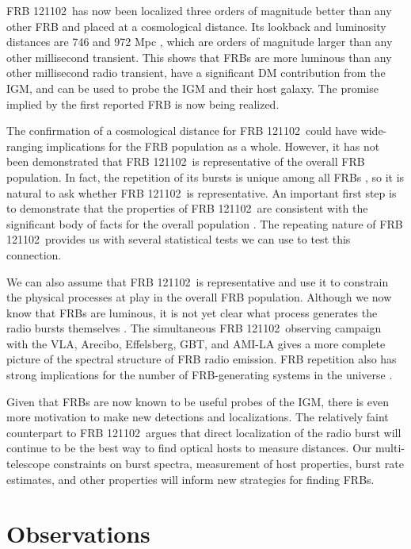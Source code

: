 \documentclass[twocolumn]{aastex61}
\newcommand{\frb}{FRB 121102}
\begin{document}
\frb\ has now been localized three orders of magnitude better than any other FRB and placed at a cosmological distance. Its lookback and luminosity distances are 746 and 972 Mpc \citep{planck15}, which are orders of magnitude larger than any other millisecond transient. This shows that FRBs are more luminous than any other millisecond radio transient, have a significant DM contribution from the IGM, and can be used to probe the IGM and their host galaxy. The promise implied by the first reported FRB \citep{2007Sci...318..777L} is now being realized.

The confirmation of a cosmological distance for \frb\ could have wide-ranging implications for the FRB population as a whole. However, it has not been demonstrated that \frb\ is representative of the overall FRB population. In fact, the repetition of its bursts is unique among all FRBs \citep{2015MNRAS.454..457P}, so it is natural to ask whether \frb\ is representative. An important first step is to demonstrate that the properties of \frb\ are consistent with the significant body of facts for the overall population \citep{2015MNRAS.451.3278M, 2016MPLA...3130013K}. The repeating nature of \frb\ provides us with several statistical tests we can use to test this connection.

We can also assume that \frb\ is representative and use it to constrain the physical processes at play in the overall FRB population. Although we now know that FRBs are luminous, it is not yet clear what process generates the radio bursts themselves \citep{2014PhRvD..89j3009K, 2014ApJ...785L..26L, 2016MNRAS.457..232C}. The simultaneous \frb\ observing campaign with the VLA, Arecibo, Effelsberg, GBT, and AMI-LA gives a more complete picture of the spectral structure of FRB radio emission. FRB repetition also has strong implications for the number of FRB-generating systems in the universe \citep{2016MNRAS.458L..89C}.

Given that FRBs are now known to be useful probes of the IGM, there is even more motivation to make new detections and localizations. The relatively faint counterpart to \frb\ argues that direct localization of the radio burst will continue to be the best way to find optical hosts to measure distances. Our multi-telescope constraints on burst spectra, measurement of host properties, burst rate estimates, and other properties will inform new strategies for finding FRBs.

\section{Observations}
\end{document}
